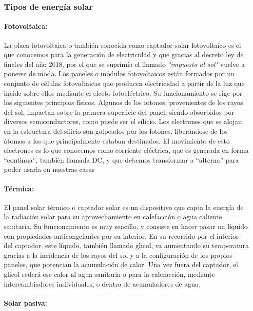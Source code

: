 \documentclass[12pt,letterpaper,superscriptaddress]{article}
\begin{document}
\subsubsection{Tipos de energía solar}

\paragraph{Fotovoltaica:}

La placa fotovoltaica o también conocida como captador solar fotovoltaico es el que conocemos para la generación de electricidad y que gracias al decreto ley de finales del año 2018, por el que se suprimía el llamado \emph{"impuesto al sol"} vuelve a ponerse de moda. Los paneles o módulos fotovoltaicos están formados por un conjunto de células fotovoltaicas que producen electricidad a partir de la luz que incide sobre ellos mediante el efecto fotoeléctrico. Su funcionamiento se rige por los siguientes principios físicos. Algunos de los fotones, provenientes de los rayos del sol, impactan sobre la primera superficie del panel, siendo absorbidos por diversos semiconductores, como puede ser el silicio. Los electrones que se alojan en la estructura del silicio son golpeados por los fotones, liberándose de los átomos a los que principalmente estaban destinados. El movimiento de esto electrones es lo que conocemos como corriente eléctrica, que es generada en forma “continua”, también llamada DC, y que debemos transformar a “alterna” para poder usarla en nuestras casas

\paragraph{Térmica:}

El panel solar térmico o captador solar es un dispositivo que capta la energía de la radiación solar para su aprovechamiento en calefacción o agua caliente sanitaria. Su funcionamiento es muy sencillo, y consiste en hacer pasar un líquido con propiedades anticongelantes por su interior. En su recorrido por el interior del captador, este líquido, también llamado glicol, va aumentando su temperatura gracias a la incidencia de los rayos del sol y a la configuración de los propios paneles, que potencian la acumulación de calor. Una vez fuera del captador, el glicol cederá ese calor al agua sanitaria o para la calefacción, mediante intercambiadores individuales, o dentro de acumuladores de agua.

\paragraph{Solar pasiva:}
\end{document}
